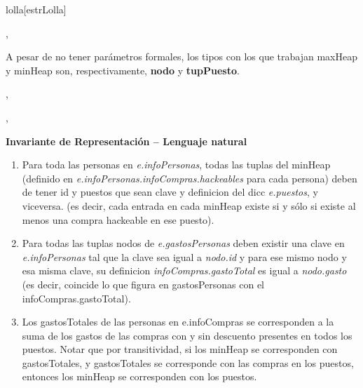\documentclass[../main.tex]{subfiles}
\begin{document}
\begin{representacion}
\begin{Estructura}{lolla}[estrLolla]
    \begin{Tupla}[infoCompras]
        , \\%
    \end{Tupla}
    
    \vspace{8mm}
    A pesar de no tener parámetros formales, los tipos con los que trabajan maxHeap y minHeap son, respectivamente, \textbf{nodo} y \textbf{tupPuesto}.
    
    \begin{Tupla}[nodo]
        ,
    \end{Tupla}
    
    \begin{Tupla}[tupPuesto]
        ,
    \end{Tupla}
\end{Estructura}

{\large\bfseries Invariante de Representación -- Lenguaje natural}
\begin{enumerate}
    \item Para toda las personas en \textit{e.infoPersonas}, todas las tuplas del minHeap (definido en \textit{e.infoPersonas.infoCompras.hackeables} para cada persona)
deben de tener id y puestos que sean clave y definicion del dicc \textit{e.puestos}, y viceversa. (es decir, cada entrada en cada minHeap existe si y sólo si existe al menos una compra hackeable en ese puesto).
    \item Para todas las tuplas nodos de \textit{e.gastosPersonas} deben existir una clave en \textit{e.infoPersonas} tal que la clave sea igual a \textit{nodo.id} y para ese mismo nodo y esa misma clave, su definicion \textit{infoCompras.gastoTotal} es igual a \textit{nodo.gasto} (es decir, coincide lo que figura en gastosPersonas con el infoCompras.gastoTotal).
    \item Los gastosTotales de las personas en e.infoCompras se corresponden a la suma de los gastos de las compras con y sin descuento presentes en todos los puestos.
    Notar que por transitividad, si los minHeap se corresponden con gastosTotales, y gastosTotales se
    corresponde con las compras en los puestos, entonces los minHeap se corresponden con los puestos.
\end{enumerate}


\end{representacion}
\end{document}
